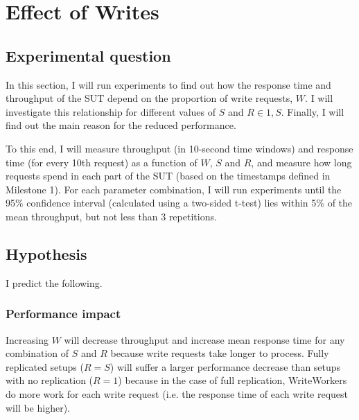 \documentclass[11pt]{article}
\begin{document}
 \clearpage
\section{Effect of Writes}
\label{sec:exp3}

\subsection{Experimental question}

In this section, I will run experiments to find out how the response time and throughput of the SUT depend on the proportion of write requests, $W$. I will investigate this relationship for different values of $S$ and $R \in {1, S}$. Finally, I will find out the main reason for the reduced performance.

To this end, I will measure throughput (in 10-second time windows) and response time (for every 10th request) as a function of $W$, $S$ and $R$, and measure how long requests spend in each part of the SUT (based on the timestamps defined in Milestone 1). For each parameter combination, I will run experiments until the 95\% confidence interval (calculated using a two-sided t-test) lies within 5\% of the mean throughput, but not less than 3 repetitions.

\subsection{Hypothesis}

I predict the following.

\subsubsection{Performance impact}
Increasing $W$ will decrease throughput and increase mean response time for any combination of $S$ and $R$ because write requests take longer to process. Fully replicated setups ($R=S$) will suffer a larger performance decrease than setups with no replication ($R=1$) because in the case of full replication, WriteWorkers do more work for each write request (i.e. the response time of each write request will be higher).
\end{document}

